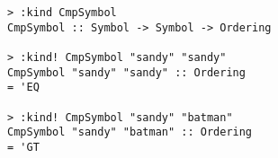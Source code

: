 \begin{repl}\begin{lstlisting}
> :kind CmpSymbol
CmpSymbol :: Symbol -> Symbol -> Ordering

> :kind! CmpSymbol "sandy" "sandy"
CmpSymbol "sandy" "sandy" :: Ordering
= 'EQ

> :kind! CmpSymbol "sandy" "batman"
CmpSymbol "sandy" "batman" :: Ordering
= 'GT\end{lstlisting}\end{repl}
